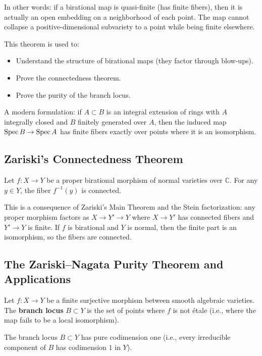 In other words: if a birational map is quasi-finite (has finite fibers), then it is actually an open embedding on a neighborhood of each point. The map cannot collapse a positive-dimensional subvariety to a point while being finite elsewhere.

This theorem is used to:
\begin{itemize}
    \item Understand the structure of birational maps (they factor through blow-ups).
    \item Prove the connectedness theorem.
    \item Prove the purity of the branch locus.
\end{itemize}

A modern formulation: if $A \subset B$ is an integral extension of rings with $A$ integrally closed and $B$ finitely generated over $A$, then the induced map $\operatorname{Spec} B \to \operatorname{Spec} A$ has finite fibers exactly over points where it is an isomorphism.

\subsection{Zariski's Connectedness Theorem}

\begin{theorem}
Let $f: X \to Y$ be a proper birational morphism of normal varieties over $\mathbb{C}$. For any $y \in Y$, the fiber $f^{-1}(y)$ is connected.
\end{theorem}

This is a consequence of Zariski's Main Theorem and the Stein factorization: any proper morphism factors as $X \to Y' \to Y$ where $X \to Y'$ has connected fibers and $Y' \to Y$ is finite. If $f$ is birational and $Y$ is normal, then the finite part is an isomorphism, so the fibers are connected.

\subsection{The Zariski--Nagata Purity Theorem and Applications}

Let $f: X \to Y$ be a finite surjective morphism between smooth algebraic varieties. The \textbf{branch locus} $B \subset Y$ is the set of points where $f$ is not \'{e}tale (i.e., where the map fails to be a local isomorphism).

\begin{theorem}
The branch locus $B \subset Y$ has pure codimension one (i.e., every irreducible component of $B$ has codimension $1$ in $Y$).
\end{theorem}

